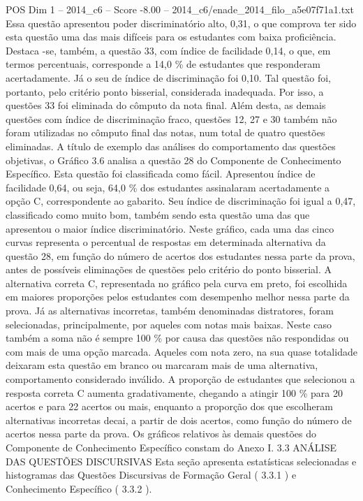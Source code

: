 \begin{textsample}{POS Dim 1 – 2014\_c6 – Score -8.00 – 2014\_c6/enade\_2014\_filo\_a5e07f71a1.txt}
Essa questão apresentou poder discriminatório alto, 0,31, o que comprova ter sido esta questão uma das mais difíceis para os estudantes com baixa proficiência.
Destaca -se, também, a questão 33, com índice de facilidade 0,14, o que, em termos percentuais, corresponde a 14,0 \% de estudantes que responderam acertadamente.
Já o seu de índice de discriminação foi 0,10.
Tal questão foi, portanto, pelo critério ponto bisserial, considerada inadequada.
Por isso, a questões 33 foi eliminada do cômputo da nota final.
Além desta, as demais questões com índice de discriminação fraco, questões 12, 27 e 30 também não foram utilizadas no cômputo final das notas, num total de quatro questões eliminadas.
A título de exemplo das análises do comportamento das questões objetivas, o Gráfico 3.6 analisa a questão 28 do Componente de Conhecimento Específico.
Esta questão foi classificada como fácil.
Apresentou índice de facilidade 0,64, ou seja, 64,0 \% dos estudantes assinalaram acertadamente a opção C, correspondente ao gabarito.
Seu índice de discriminação foi igual a 0,47, classificado como muito bom, também sendo esta questão uma das que apresentou o maior índice discriminatório.
Neste gráfico, cada uma das cinco curvas representa o percentual de respostas em determinada alternativa da questão 28, em função do número de acertos dos estudantes nessa parte da prova, antes de possíveis eliminações de questões pelo critério do ponto bisserial.
A alternativa correta C, representada no gráfico pela curva em preto, foi escolhida em maiores proporções pelos estudantes com desempenho melhor nessa parte da prova.
Já as alternativas incorretas, também denominadas distratores, foram selecionadas, principalmente, por aqueles com notas mais baixas.
Neste caso também a soma não é sempre 100 \% por causa das questões não respondidas ou com mais de uma opção marcada.
Aqueles com nota zero, na sua quase totalidade deixaram esta questão em branco ou marcaram mais de uma alternativa, comportamento considerado inválido.
A proporção de estudantes que selecionou a resposta correta C aumenta gradativamente, chegando a atingir 100 \% para 20 acertos e para 22 acertos ou mais, enquanto a proporção dos que escolheram alternativas incorretas decai, a partir de dois acertos, como função do número de acertos nessa parte da prova.
Os gráficos relativos às demais questões do Componente de Conhecimento Específico constam do Anexo I. 3.3 ANÁLISE DAS QUESTÕES DISCURSIVAS Esta seção apresenta estatísticas selecionadas e histogramas das Questões Discursivas de Formação Geral ( 3.3.1 ) e Conhecimento Específico ( 3.3.2 ).

\end{textsample}
